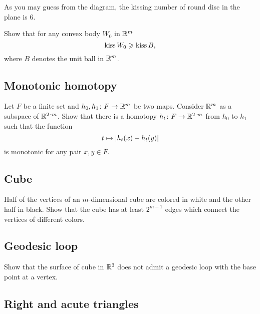 As you may guess from the diagram, the kissing number of round disc in the plane is $6$.

\begin{pr}
Show that for any convex body $W_0$ in $\RR^m$
$$\mathop{\rm kiss}W_0\ge \mathop{\rm kiss}B,$$
where $B$ denotes the unit ball in $\RR^m$.
\end{pr}

\subsection*{Monotonic homotopy}
\label{mono-homotopy}

\begin{pr}
Let $F$ be a finite set and $h_0,h_1\: F\to\RR^m$ be two maps.
Consider $\RR^m$ as a subspace of $\RR^{2\cdot m}$.
Show that there is a homotopy  $h_t\:F\z\to\RR^{2\cdot m}$ from $h_0$ to $h_1$ such that  the function 
\[t\z\mapsto |h_t(x)-h_t(y)|\] 
is monotonic for any pair $x,y\in F$.
\end{pr}

\subsection*{Cube}\label{Cube}

\begin{pr}
Half of the vertices 
of an $m$-dimensional cube
are colored in white and the other half in black.
Show that the cube has at least $2^{m-1}$ edges which connect the vertices of different colors. 
\end{pr}

\subsection*{Geodesic loop}\label{Geodesic loop}

\begin{pr}
Show that the surface of cube in $\RR^3$
does not admit a geodesic loop with the base point at a vertex.
\end{pr}

\subsection*{Right and acute triangles}\label{Right and acute triangles}

